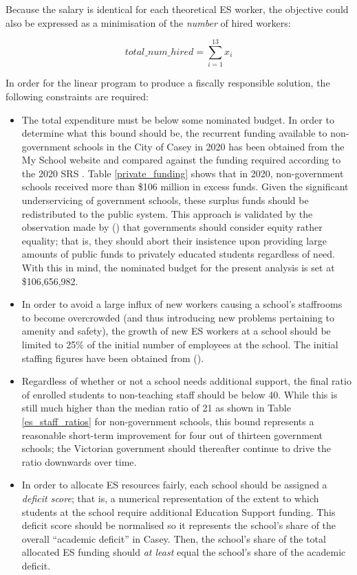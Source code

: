 \documentclass[11pt, a4paper]{article}
\begin{document}
    Because the salary is identical for each theoretical ES worker, the objective could also be expressed as a minimisation of the \textit{number} of hired workers:

    \begin{equation}
        total\_num\_hired = \sum_{i=1}^{13} x_i
    \end{equation}

    In order for the linear program to produce a fiscally responsible solution, the following constraints are required:

    \begin{itemize}
        \item The total expenditure must be below some nominated budget. In order to determine what this bound should be, the recurrent funding available to non-government schools in the City of Casey in 2020 has been obtained from the My School website \parencite{naplan} and compared against the funding required according to the 2020 SRS \parencite{srs_2020}. Table \ref{private_funding} shows that in 2020, non-government schools received more than \$106 million in excess funds. Given the significant underservicing of government schools, these surplus funds should be redistributed to the public system. This approach is validated by the observation made by  () that governments should consider equity rather equality; that is, they should abort their insistence upon providing large amounts of public funds to privately educated students regardless of need. With this in mind, the nominated budget for the present analysis is set at \$106,656,982.
        \item In order to avoid a large influx of new workers causing a school's staffrooms to become overcrowded (and thus introducing new problems pertaining to amenity and safety), the growth of new ES workers at a school should be limited to 25\% of the initial number of employees at the school. The initial staffing figures have been obtained from  ().
        \item Regardless of whether or not a school needs additional support, the final ratio of enrolled students to non-teaching staff should be below 40. While this is still much higher than the median ratio of 21 as shown in Table \ref{es_staff_ratios} for non-government schools, this bound represents a reasonable short-term improvement for four out of thirteen government schools; the Victorian government should thereafter continue to drive the ratio downwards over time.
        \item In order to allocate ES resources fairly, each school should be assigned a \textit{deficit score}; that is, a numerical representation of the extent to which students at the school require additional Education Support funding. This deficit score should be normalised so it represents the school's share of the overall ``academic deficit'' in Casey. Then, the school's share of the total allocated ES funding should \textit{at least} equal the school's share of the academic deficit.
    \end{itemize}
\end{document}
